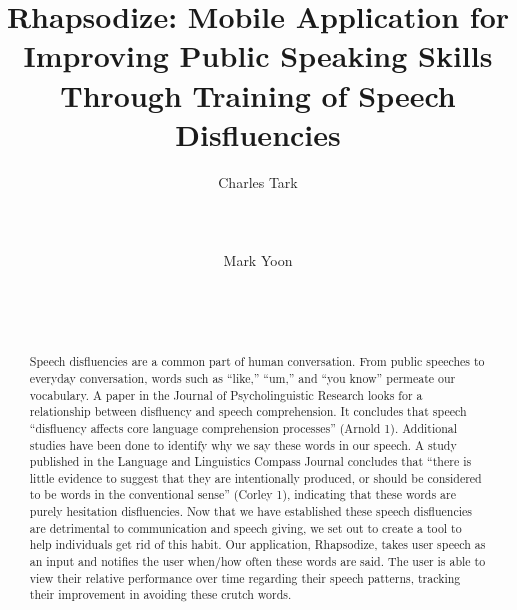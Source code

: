 \documentclass{sigchi}
\begin{document}
\title{Rhapsodize: Mobile Application for Improving Public Speaking Skills Through Training of Speech Disfluencies}

\author{
  \alignauthor Charles Tark\\
    \\
    \\
    \\
  \alignauthor Mark Yoon\\
    \\
    \\
    \\
}

\maketitle

\begin{abstract}
Speech disfluencies are a common part of human conversation. From public speeches to everyday conversation, words such as “like,” “um,” and “you know” permeate our vocabulary. A paper in the Journal of Psycholinguistic Research looks for a relationship between disfluency and speech comprehension. It concludes that speech “disfluency affects core language comprehension processes” (Arnold 1). Additional studies have been done to identify why we say these words in our speech. A study published in the Language and Linguistics Compass Journal concludes that “there is little evidence to suggest that they are intentionally produced, or should be considered to be words in the conventional sense” (Corley 1), indicating that these words are purely hesitation disfluencies. Now that we have established these speech disfluencies are detrimental to communication and speech giving, we set out to create a tool to help individuals get rid of this habit. Our application, Rhapsodize, takes user speech as an input and notifies the user when/how often these words are said. The user is able to view their relative performance over time regarding their speech patterns, tracking their improvement in avoiding these crutch words.
\end{abstract}


\end{document}
